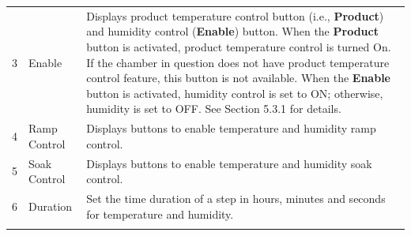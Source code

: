 \begin{longtable}[]{@{}lll@{}}
\begin{minipage}[t]{0.04\columnwidth}
3\strut
\end{minipage} & \begin{minipage}[t]{0.23\columnwidth}\raggedright
Enable\strut
\end{minipage} & \begin{minipage}[t]{0.65\columnwidth}\raggedright
Displays product temperature control button (i.e., \textbf{Product}) and
humidity control (\textbf{Enable}) button. When the \textbf{Product}
button is activated, product temperature control is turned On. If the
chamber in question does not have product temperature control feature,
this button is not available. When the \textbf{Enable} button is
activated, humidity control is set to ON; otherwise, humidity is set to
OFF. See Section 5.3.1 for details.\strut
\end{minipage}\tabularnewline
\begin{minipage}[t]{0.04\columnwidth}\raggedright
4\strut
\end{minipage} & \begin{minipage}[t]{0.23\columnwidth}\raggedright
Ramp Control\strut
\end{minipage} & \begin{minipage}[t]{0.65\columnwidth}\raggedright
Displays buttons to enable temperature and humidity ramp control.\strut
\end{minipage}\tabularnewline
\begin{minipage}[t]{0.04\columnwidth}\raggedright
5\strut
\end{minipage} & \begin{minipage}[t]{0.23\columnwidth}\raggedright
Soak Control\strut
\end{minipage} & \begin{minipage}[t]{0.65\columnwidth}\raggedright
Displays buttons to enable temperature and humidity soak control.\strut
\end{minipage}\tabularnewline
\begin{minipage}[t]{0.04\columnwidth}\raggedright
6\strut
\end{minipage} & \begin{minipage}[t]{0.23\columnwidth}\raggedright
Duration\strut
\end{minipage} & \begin{minipage}[t]{0.65\columnwidth}\raggedright
Set the time duration of a step in hours, minutes and seconds for
temperature and humidity.\strut
\end{minipage}\tabularnewline
\begin{minipage}[t]{0.04\columnwidth}\raggedright

\end{minipage}
\end{longtable}
